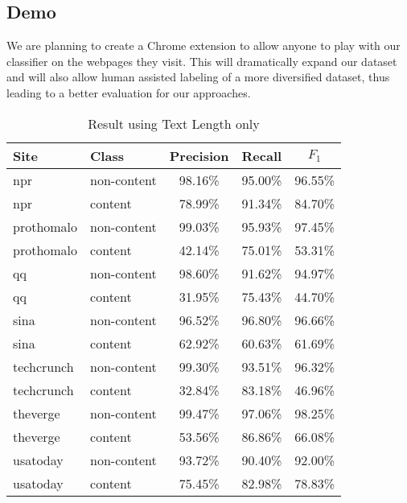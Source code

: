 \documentclass{acm_proc_article-sp}
\begin{document}
\subsection{Demo}
We are planning to create a Chrome extension to allow anyone to play with our classifier on the webpages they visit. This will dramatically expand our dataset and will also allow human assisted labeling of a more diversified dataset, thus leading to a better evaluation for our approaches.




\begin{table}
\centering
\caption{\label{table:textlength}Result using Text Length only}
\begin{tabular}{|l|l|c|c|c|} \hline
Site&Class&Precision&Recall&$F_1$\\ \hline\hline
npr&non-content&98.16\%&95.00\%&96.55\%\\ \hline
npr&content&78.99\%&91.34\%&84.70\%\\ \hline
prothomalo&non-content&99.03\%&95.93\%&97.45\%\\ \hline
prothomalo&content&42.14\%&75.01\%&53.31\%\\ \hline
qq&non-content&98.60\%&91.62\%&94.97\%\\ \hline
qq&content&31.95\%&75.43\%&44.70\%\\ \hline
sina&non-content&96.52\%&96.80\%&96.66\%\\ \hline
sina&content&62.92\%&60.63\%&61.69\%\\ \hline
techcrunch&non-content&99.30\%&93.51\%&96.32\%\\ \hline
techcrunch&content&32.84\%&83.18\%&46.96\%\\ \hline
theverge&non-content&99.47\%&97.06\%&98.25\%\\ \hline
theverge&content&53.56\%&86.86\%&66.08\%\\ \hline
usatoday&non-content&93.72\%&90.40\%&92.00\%\\ \hline
usatoday&content&75.45\%&82.98\%&78.83\%\\ \hline
\end{tabular}
\end{table}
\end{document}
